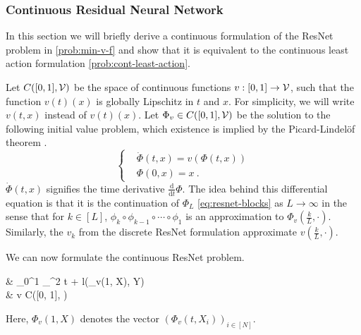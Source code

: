 \subsubsection{Continuous Residual Neural Network} 
In this section we will briefly derive a continuous formulation of the ResNet problem in \ref{prob:min-v-f} and show that it is equivalent to the continuous least action formulation \ref{prob:cont-least-action}.

Let $C([0, 1], \mathcal{V})$ be the space of continuous functions $v: [0, 1] \rightarrow \mathcal{V}$, such that the function $v(t)(x)$ is globally Lipschitz in $t$ and $x$.
For simplicity, we will write $v(t, x)$ instead of $v(t)(x)$.
Let $\Phi_v \in C([0, 1], \mathcal{V})$ be the solution to the following initial value problem, which existence is implied by the Picard-Lindelöf theorem \cite[Theorem 1.2.3]{arino06}.
\begin{equation}
	\label{eq:phi-v-differential-equation}
	\begin{cases}
		&\dot{\Phi}(t, x) = v(\Phi(t, x))\\
		&\Phi(0, x) = x \ .
	\end{cases}
\end{equation}
$\dot{\Phi}(t, x)$ signifies the time derivative $\frac{\mathrm{d}}{\mathrm{d}t}\Phi$.
The idea behind this differential equation is that it is the continuation of $\Phi_L$ \ref{eq:resnet-blocks} as $L \rightarrow \infty$  in the sense that for $k \in [L]$, $\phi_k \circ \phi_{k-1} \circ \cdots \circ \phi_1$ is an approximation to $\Phi_v(\frac{k}{L}, \cdot)$.
Similarly, the $v_k$ from the discrete ResNet formulation approximate $v(\frac{k}{L}, \cdot)$.

We can now formulate the continuous ResNet problem.
\begin{problem}
	\label{prob:resnet-limit}
	\begin{cases}
		&  \int_{0}^{1} _\cV^2 t
		+ l(\Phi_v(1, X), Y)\\
		& v \in C([0, 1], \cV)\\
	\end{cases}
\end{problem}
Here, $\Phi_v(1, X)$ denotes the vector $(\Phi_v(t, X_i))_{i \in [N]}$.


